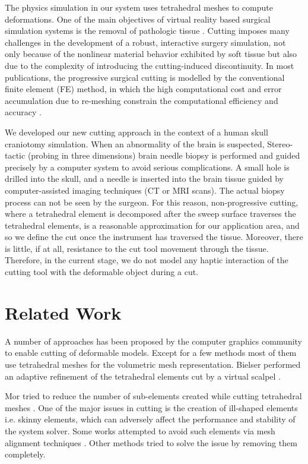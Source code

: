 \label{chapter:Cutting}
The physics simulation in our system uses tetrahedral meshes to compute deformations.
One of the main objectives of virtual reality based surgical simulation systems is the removal of pathologic tissue 
\cite{Steinemann, Nienhuys2001a}. Cutting imposes many challenges in the development of a robust, interactive surgery 
simulation, not only because of the nonlinear material behavior exhibited by soft tissue but also due to the
complexity of introducing the cutting-induced discontinuity. In most publications, the progressive surgical cutting is modelled
by the conventional finite element (FE) method, in which the high computational cost and error accumulation due to re-meshing constrain 
the computational efficiency and accuracy \cite{Steinemann, Courtecuisse2010a}. 

We developed our new cutting approach in the context of a human skull craniotomy simulation. When an abnormality of the brain is suspected, 
Stereo-tactic (probing in three dimensions) brain needle biopsy is performed and guided precisely by a computer system to avoid 
serious complications. A small hole is drilled into the skull, and a needle is inserted into the brain tissue guided by computer-assisted 
imaging techniques (CT or MRI scans). The actual biopsy process can not be seen by the surgeon. For this reason,
non-progressive cutting, where a tetrahedral element is decomposed after the sweep surface traverses the tetrahedral elements, is a reasonable
approximation for our application area, and so we define the cut once the instrument has traversed the tissue. 
Moreover, there is little, if at all, resistance to the cut tool movement through the tissue. Therefore, in the current stage, we do 
not model any haptic interaction of the cutting tool with the deformable object during a cut. 


\section{Related Work}
A number of approaches has been proposed by the computer graphics community to enable cutting of deformable models. 
Except for a few methods most of them use tetrahedral meshes for the volumetric mesh representation. 
Bielser \etal performed an adaptive refinement of the tetrahedral elements cut by a virtual scalpel \cite{Bielser1999}.

Mor \etal tried to reduce the number of sub-elements created while cutting tetrahedral meshes \cite{Mor2000}.
One of the major issues in cutting is the creation of ill-shaped elements i.e. skinny elements, which can adversely affect the
performance and stability of the system solver. Some works attempted to avoid such elements via mesh alignment techniques 
\cite{Nienhuys2001a, Steinemann2006}. Other methods tried to solve the issue by removing them completely.


